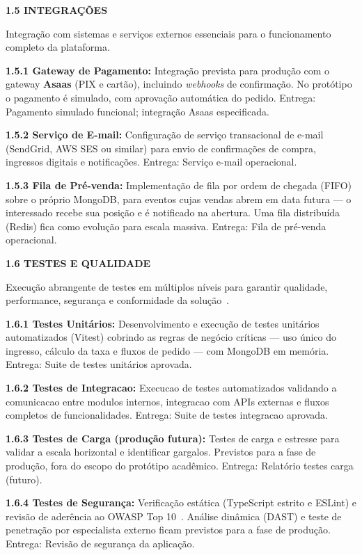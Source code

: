 \textbf{1.5 INTEGRAÇÕES}

Integração com sistemas e serviços externos essenciais para o funcionamento completo da plataforma.

\textbf{1.5.1 Gateway de Pagamento:} Integração prevista para produção com o gateway \textbf{Asaas} (PIX e cartão), incluindo \textit{webhooks} de confirmação. No protótipo o pagamento é simulado, com aprovação automática do pedido. Entrega: Pagamento simulado funcional; integração Asaas especificada.

\textbf{1.5.2 Serviço de E-mail:} Configuração de serviço transacional de e-mail (SendGrid, AWS SES ou similar) para envio de confirmações de compra, ingressos digitais e notificações. Entrega: Serviço e-mail operacional.

\textbf{1.5.3 Fila de Pré-venda:} Implementação de fila por ordem de chegada (FIFO) sobre o próprio MongoDB, para eventos cujas vendas abrem em data futura — o interessado recebe sua posição e é notificado na abertura. Uma fila distribuída (Redis) fica como evolução para escala massiva. Entrega: Fila de pré-venda operacional.

\textbf{1.6 TESTES E QUALIDADE}

Execução abrangente de testes em múltiplos níveis para garantir qualidade, performance, segurança e conformidade da solução~\cite{Pressman:2019}.

\textbf{1.6.1 Testes Unitários:} Desenvolvimento e execução de testes unitários automatizados (Vitest) cobrindo as regras de negócio críticas — uso único do ingresso, cálculo da taxa e fluxos de pedido — com MongoDB em memória. Entrega: Suite de testes unitários aprovada.

\textbf{1.6.2 Testes de Integracao:} Execucao de testes automatizados validando a comunicacao entre modulos internos, integracao com APIs externas e fluxos completos de funcionalidades. Entrega: Suite de testes integracao aprovada.

\textbf{1.6.3 Testes de Carga (produção futura):} Testes de carga e estresse para validar a escala horizontal e identificar gargalos. Previstos para a fase de produção, fora do escopo do protótipo acadêmico. Entrega: Relatório testes carga (futuro).

\textbf{1.6.4 Testes de Segurança:} Verificação estática (TypeScript estrito e ESLint) e revisão de aderência ao OWASP Top 10~\cite{OWASP:2021}. Análise dinâmica (DAST) e teste de penetração por especialista externo ficam previstos para a fase de produção. Entrega: Revisão de segurança da aplicação.

